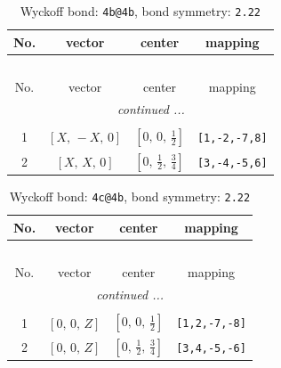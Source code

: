 \documentclass[fleqn,8pt]{jsarticle}
\begin{document}
\renewcommand{\arraystretch}{1.2}
\begin{longtable}{cccc}
\caption{Wyckoff bond: {\tt 4b@4b}, bond symmetry: {\tt 2.22}}
 \\
 \hline \hline
No. & vector & center & mapping \\ \hline \endfirsthead

\multicolumn{3}{l}{\tablename\ \thetable{}} \\
 \hline \hline
No. & vector & center & mapping \\ \hline \endhead

 \hline \hline
\multicolumn{3}{r}{\footnotesize\it continued ...} \\ \endfoot

 \hline \hline
\multicolumn{3}{r}{} \\ \endlastfoot

1 & $\left[ X,\, - X,\, 0 \right]$ & $\left[ 0,\, 0,\, \frac{1}{2} \right]$ & {\tt [1,-2,-7,8]} \\ \hline
2 & $\left[ X,\, X,\, 0 \right]$ & $\left[ 0,\, \frac{1}{2},\, \frac{3}{4} \right]$ & {\tt [3,-4,-5,6]} \\
\end{longtable}
\renewcommand{\arraystretch}{1.2}
\begin{longtable}{cccc}
\caption{Wyckoff bond: {\tt 4c@4b}, bond symmetry: {\tt 2.22}}
 \\
 \hline \hline
No. & vector & center & mapping \\ \hline \endfirsthead

\multicolumn{3}{l}{\tablename\ \thetable{}} \\
 \hline \hline
No. & vector & center & mapping \\ \hline \endhead

 \hline \hline
\multicolumn{3}{r}{\footnotesize\it continued ...} \\ \endfoot

 \hline \hline
\multicolumn{3}{r}{} \\ \endlastfoot

1 & $\left[ 0,\, 0,\, Z \right]$ & $\left[ 0,\, 0,\, \frac{1}{2} \right]$ & {\tt [1,2,-7,-8]} \\ \hline
2 & $\left[ 0,\, 0,\, Z \right]$ & $\left[ 0,\, \frac{1}{2},\, \frac{3}{4} \right]$ & {\tt [3,4,-5,-6]} \\
\end{longtable}
\renewcommand{\arraystretch}{1.2}
\end{document}
